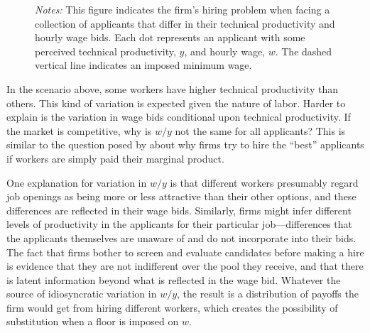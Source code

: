 \documentclass[AER]{AEA}
\begin{document}
\begin{figure}[ht]
\begin{minipage}{.95 \linewidth}
\end{minipage}
\begin{minipage}{0.95\linewidth}
{\footnotesize
  \emph{Notes:} This figure indicates the firm's hiring problem when facing a collection of applicants that differ in their technical productivity and hourly wage bids.
  Each dot represents an applicant with some perceived technical productivity, $y$, and hourly wage, $w$.
  The dashed vertical line indicates an imposed minimum wage.
}
\end{minipage} 
\end{figure} 

In the scenario above, some workers have higher technical productivity than others.
This kind of variation is expected given the nature of labor.
Harder to explain is the variation in wage bids conditional upon technical productivity.
If the market is competitive, why is $w/y$ not the same for all applicants?
This is similar to the question posed by \cite{romer1992firms} about why firms try to hire the ``best'' applicants if workers are simply paid their marginal product. 


One explanation for variation in $w/y$ is that different workers presumably regard job openings as being more or less attractive than their other options, and these differences are reflected in their wage bids. 
Similarly, firms might infer different levels of productivity in the applicants for their particular job---differences that the applicants themselves are unaware of and do not incorporate into their bids. 
The fact that firms bother to screen and evaluate candidates before making a hire is evidence that they are not indifferent over the pool they receive, and that there is latent information beyond what is reflected in the wage bid.
Whatever the source of idiosyncratic variation in $w/y$, the result is a distribution of payoffs the firm would get from hiring different workers, which creates the possibility of substitution when a floor is imposed on $w$. 
\end{document}
